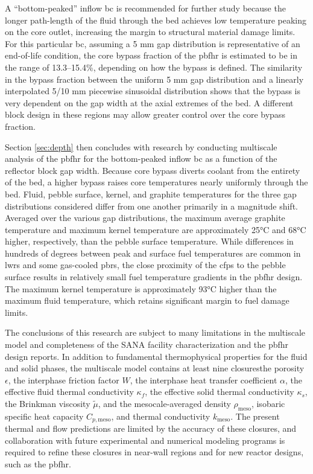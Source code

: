A ``bottom-peaked'' inflow \gls{bc} is recommended for further study because the longer path-length of the fluid through the bed achieves low temperature peaking on the core outlet, increasing the margin to structural material damage limits. For this particular \gls{bc}, assuming a 5 \si{\milli\meter} gap distribution is representative of an end-of-life condition, the core bypass fraction of the \gls{pbfhr} is estimated to be in the range of 13.3--15.4\%, depending on how the bypass is defined. The similarity in the bypass fraction between the uniform 5 \si{\milli\meter} gap distribution and a linearly interpolated 5/10 \si{\milli\meter} piecewise sinusoidal distribution shows that the bypass is very dependent on the gap width at the axial extremes of the bed. A different block design in these regions may allow greater control over the core bypass fraction.

Section \ref{sec:depth} then concludes with research by conducting multiscale analysis of the \gls{pbfhr} for the bottom-peaked inflow \gls{bc} as a function of the reflector block gap width. Because core bypass diverts coolant from the entirety of the bed, a higher bypass raises core temperatures nearly uniformly through the bed. Fluid, pebble surface, kernel, and graphite temperatures for the three gap distributions considered differ from one another primarily in a magnitude shift. Averaged over the various gap distributions, the maximum average graphite temperature and maximum kernel temperature are approximately 25\si{\celsius} and 68\si{\celsius} higher, respectively, than the pebble surface temperature. While differences in hundreds of degrees between peak and surface fuel temperatures are common in \glspl{lwr} and some gas-cooled \glspl{pbr}, the close proximity of the \glspl{cfp} to the pebble surface results in relatively small fuel temperature gradients in the \gls{pbfhr} design. The maximum kernel temperature is approximately 93\si{\celsius} higher than the maximum fluid temperature, which retains significant margin to fuel damage limits.

The conclusions of this research are subject to many limitations in the multiscale model and completeness of the SANA facility characterization and the \gls{pbfhr} design reports. In addition to fundamental thermophysical properties for the fluid and solid phases, the multiscale model contains at least nine closures\mdash the porosity \(\epsilon\), the interphase friction factor \(W\), the interphase heat transfer coefficient \(\alpha\), the effective fluid thermal conductivity \(\kappa_f\), the effective solid thermal conductivity \(\kappa_s\), the Brinkman viscosity \(\tilde{\mu}\), and the mesocale-averaged density \(\rho_\text{meso}\), isobaric specific heat capacity \(C_{p,\text{meso}}\), and thermal conductivity \(k_\text{meso}\). The present thermal and flow predictions are limited by the accuracy of these closures, and collaboration with future experimental and numerical modeling programs is required to refine these closures in near-wall regions and for new reactor designs, such as the \gls{pbfhr}. 


